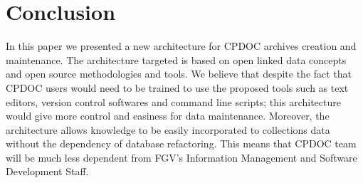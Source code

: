 
\section{Conclusion}


In this paper we presented a new architecture for CPDOC archives
creation and maintenance. The architecture targeted is based on open
linked data concepts and open source methodologies and tools. We
believe that despite the fact that CPDOC users would need to be
trained to use the proposed tools such as text editors, version
control softwares and command line scripts; this architecture would
give more control and easiness for data maintenance. Moreover, the
architecture allows knowledge to be easily incorporated to collections
data without the dependency of database refactoring. This means that
CPDOC team will be much less dependent from FGV's Information
Management and Software Development Staff.


